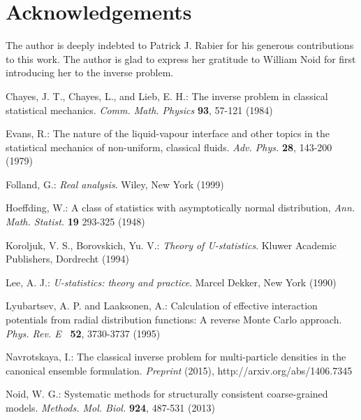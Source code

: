 \documentclass[12pt,leqno]{amsart}
\numberwithin{equation}{section}
\numberwithin{theor}{section}
\numberwithin{rem}{section}
\begin{document}
 
\section*{Acknowledgements}

The author is deeply indebted to Patrick J. Rabier for his generous contributions to this work.  The author is glad to express her gratitude to William Noid for first introducing her to the inverse problem.  

\begin{thebibliography}{}

  Chayes, J. T., Chayes, L., and Lieb, E. H.: The inverse
problem in classical statistical mechanics. \textit{Comm. Math. Physics} 
\textbf{93}, 57-121 (1984)

  Evans, R.: The nature of the liquid-vapour interface and other topics in the statistical mechanics of non-uniform, classical fluids. \textit{Adv. Phys.} 
\textbf{28}, 143-200 (1979) 

  Folland, G.: \textit{Real analysis}.  
Wiley, New York (1999)

  Hoeffding, W.:  A class of statistics with asymptotically normal distribution, \textit{Ann. Math. Statist.} 
\textbf{19} 293-325 (1948)

  Koroljuk, V. S., Borovskich, Yu. V.: \textit{Theory of U-statistics}.  
Kluwer Academic Publishers, Dordrecht (1994)

  Lee, A. J.: \textit{U-statistics: theory and practice}.  
Marcel Dekker, New York (1990)

  Lyubartsev, A. P. and Laaksonen, A.: Calculation of
effective interaction potentials from radial distribution functions: A
reverse Monte Carlo approach. \textit{Phys. Rev. E} \textbf{\ 52}, 3730-3737 (1995)

  Navrotskaya, I.: The classical inverse problem for multi-particle densities in the canonical ensemble formulation. \textit{Preprint} (2015), http://arxiv.org/abs/1406.7345

  Noid, W. G.: Systematic methods for structurally consistent coarse-grained models. \textit{Methods. Mol.
Biol.} \textbf{924}, 487-531 (2013)

 

\end{thebibliography}
\end{document}
